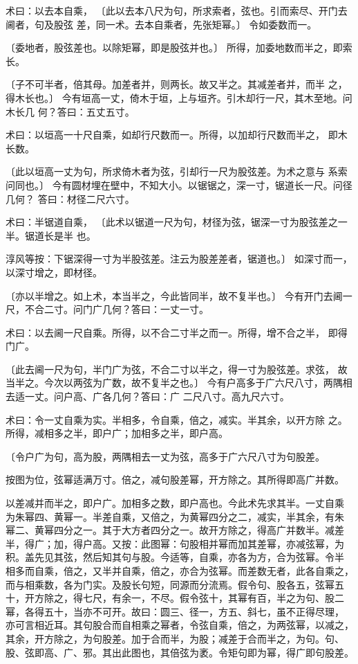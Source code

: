 \documentclass[a4paper,12pt,UTF8,twoside]{ctexbook}
\begin{document}
术曰：以去本自乘， 〔此以去本八尺为句，所求索者，弦也。引而索尽、开门去阃者，句及股弦 差，同一术。去本自乘者，先张矩幂。〕 令如委数而一。

〔委地者，股弦差也。以除矩幂，即是股弦并也。〕 所得，加委地数而半之，即索长。

〔子不可半者，倍其母。加差者并，则两长。故又半之。其减差者并，而半 之，得木长也。〕 今有垣高一丈，倚木于垣，上与垣齐。引木却行一尺，其木至地。问木长几 何？答曰：五丈五寸。

术曰：以垣高一十尺自乘，如却行尺数而一。所得，以加却行尺数而半之， 即木长数。

〔此以垣高一丈为句，所求倚木者为弦，引却行一尺为股弦差。为术之意与 系索问同也。〕 今有圆材埋在壁中，不知大小。以锯锯之，深一寸，锯道长一尺。问径几何？ 答曰：材径二尺六寸。

术曰：半锯道自乘， 〔此术以锯道一尺为句，材径为弦，锯深一寸为股弦差之一半。锯道长是半 也。

淳风等按：下锯深得一寸为半股弦差。注云为股差差者，锯道也。〕 如深寸而一，以深寸增之，即材径。

〔亦以半增之。如上术，本当半之，今此皆同半，故不复半也。〕 今有开门去阃一尺，不合二寸。问门广几何？答曰：一丈一寸。

术曰：以去阃一尺自乘。所得，以不合二寸半之而一。所得，增不合之半， 即得门广。

〔此去阃一尺为句，半门广为弦，不合二寸以半之，得一寸为股弦差。求弦， 故当半之。今次以两弦为广数，故不复半之也。〕 今有户高多于广六尺八寸，两隅相去适一丈。问户高、广各几何？答曰：广 二尺八寸。高九尺六寸。

术曰：令一丈自乘为实。半相多，令自乘，倍之，减实。半其余，以开方除 之。所得，减相多之半，即户广；加相多之半，即户高。

〔令户广为句，高为股，两隅相去一丈为弦，高多于广六尺八寸为句股差。

按图为位，弦幂适满万寸。倍之，减句股差幂，开方除之。其所得即高广并数。

以差减并而半之，即户广。加相多之数，即户高也。今此术先求其半。一丈自乘 为朱幂四、黄幂一。半差自乘，又倍之，为黄幂四分之二，减实，半其余，有朱 幂二、黄幂四分之一。其于大方者四分之一。故开方除之，得高广并数半。减差 半，得广；加，得户高。又按：此图幂：句股相并幂而加其差幂，亦减弦幂，为 积。盖先见其弦，然后知其句与股。今适等，自乘，亦各为方，合为弦幂。令半 相多而自乘，倍之，又半并自乘，倍之，亦合为弦幂。而差数无者，此各自乘之， 而与相乘数，各为门实。及股长句短，同源而分流焉。假令句、股各五，弦幂五 十，开方除之，得七尺，有余一，不尽。假令弦十，其幂有百，半之为句、股二 幂，各得五十，当亦不可开。故曰：圆三、径一，方五、斜七，虽不正得尽理， 亦可言相近耳。其句股合而自相乘之幂者，令弦自乘，倍之，为两弦幂，以减之， 其余，开方除之，为句股差。加于合而半，为股；减差于合而半之，为句。句、 股、弦即高、广、邪。其出此图也，其倍弦为袤。令矩句即为幂，得广即句股差。
\end{document}
